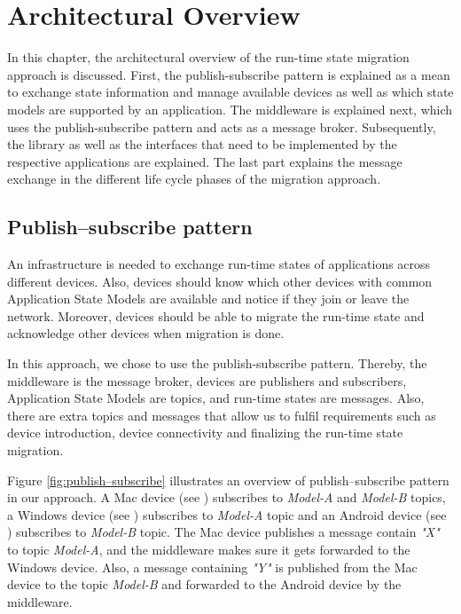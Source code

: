 \chapter{Architectural Overview}
\label{ch:architectural_overview}
In this chapter, the architectural overview of the run-time state migration approach is discussed. First, the publish-subscribe pattern is explained as a mean to exchange state information and manage available devices as well as which state models are supported by an application. The middleware is explained next, which uses the publish-subscribe pattern and acts as a message broker. Subsequently, the library as well as the interfaces that need to be implemented by the respective applications are explained. The last part explains the message exchange in the different life cycle phases of the migration approach.

\section{Publish–subscribe pattern}
An infrastructure is needed to exchange run-time states of applications across different devices. Also, devices should know which other devices with common Application State Models are available and notice if they join or leave the network. Moreover, devices should be able to migrate the run-time state and acknowledge other devices when migration is done.

In this approach, we chose to use the publish-subscribe pattern. Thereby, the middleware is the message broker, devices are publishers and subscribers, Application State Models are topics, and run-time states are messages. Also, there are extra topics and messages that allow us to fulfil requirements such as device introduction, device connectivity and finalizing the run-time state migration.

Figure \ref{fig:publish–subscribe} illustrates an overview of publish–subscribe pattern in our approach. A Mac device (see \fcircone) subscribes to \textit{Model-A} and \textit{Model-B} topics, a Windows device (see \fcirctwo) subscribes to \textit{Model-A} topic and an Android device (see \fcircthree) subscribes to \textit{Model-B} topic. The Mac device publishes a message contain \textit{"X"} to topic \textit{Model-A}, and the middleware makes sure it gets forwarded to the Windows device. Also, a message containing \textit{"Y"} is published from the Mac device to the topic \textit{Model-B} and forwarded to the Android device by the middleware.

